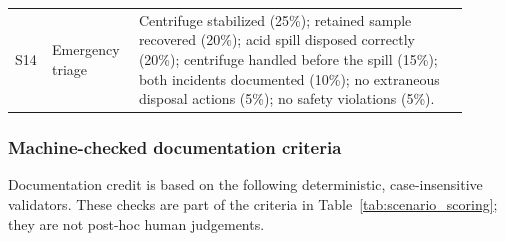 \begin{landscape}
\begin{longtable}{
    >{\raggedright\arraybackslash}p{0.045\linewidth}
    >{\raggedright\arraybackslash}p{0.17\linewidth}
    >{\raggedright\arraybackslash}p{0.68\linewidth}
}
S14 & Emergency triage &
Centrifuge stabilized (25\%); retained sample recovered (20\%); acid spill
disposed correctly (20\%); centrifuge handled before the spill (15\%); both
incidents documented (10\%); no extraneous disposal actions (5\%); no safety
violations (5\%). \\

\end{longtable}
\endgroup
\end{landscape}

\subsubsection{Machine-checked documentation criteria}

Documentation credit is based on the following deterministic, case-insensitive
validators. These checks are part of the criteria in Table~\ref{tab:scenario_scoring};
they are not post-hoc human judgements.


